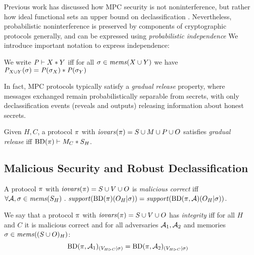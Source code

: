 Previous work has discussed how MPC security is not noninterference,
but rather how ideal functional sets an upper bound on
declassification \cite{6266151,almeida2018enforcing}. Nevertheless,
probabilistic noninterference is preserved by components of
cryptographic protocols generally, and can be expressed using
\emph{probabilistic independence} \cite{darais2019language,barthe2019probabilistic}
We introduce important notation to express independence:
\begin{definition}
  We write $\mathit{P} \vdash X * Y$ iff for all
    $\sigma \in \mathit{mems}(X \cup Y)$ we have
  ${\mathit{P}}_{X \cup Y}(\sigma) =
  \mathit{P}(\sigma_X) * \mathit{P}(\sigma_Y)$
\end{definition}

In fact, MPC protocols typically satisfy a \emph{gradual release}
property\cite{XXX}, where messages exchanged remain probabilistically separable
from secrets, with only declassification events (reveals and outputs)
releasing information about honest secrets. 
\begin{definition}
  Given $H,C$, a protocol $\pi$ with $\mathit{iovars}(\pi) = S \cup M \cup P \cup O$
  satisfies \emph{gradual release} iff
  $\mathrm{BD}(\pi) \vdash M_C * S_H$.
\end{definition}

\subsection{Malicious Security and Robust Declassification}

\begin{definition}
  A protocol $\pi$ with $\mathit{iovars}(\pi) = S \cup V \cup O$ is \emph{malicious correct} iff
  $
  \forall \adversary, \store \in \mems(S_H) \ .\ \support(\progtt(\prog)(O_H|\store)) =
    \support(\progtt(\prog,\adversary)(O_H|\store))
  $.
\end{definition}

\begin{definition}[Integrity]
  We say that a protocol $\pi$ with $\mathit{iovars}(\pi) = S \cup V \cup O$ has
  \emph{integrity} iff for all $H$ and $C$ 
  it is malicious correct and for all adversaries $\mathcal{A}_1,\mathcal{A}_2$
  and memories $\sigma \in \mathit{mems}((S \cup O)_H)$:
    $$
    \mathrm{BD}(\pi,\mathcal{A}_1)_{({V_{H \rhd C}}|{\sigma})} =
    \mathrm{BD}(\pi,\mathcal{A}_2)_{({V_{H \rhd C}}|{\sigma})}
    $$
\end{definition}

